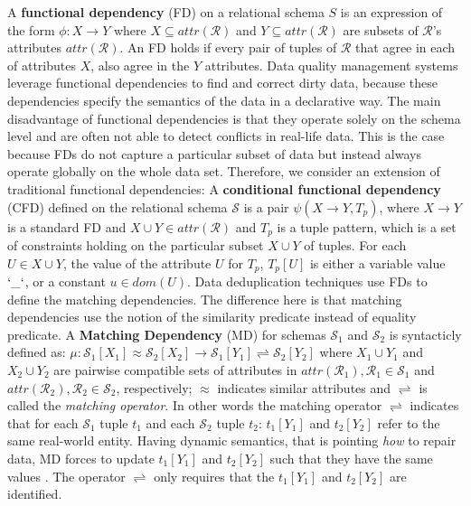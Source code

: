A \textbf{functional dependency} (FD) on a relational schema $S$ is an expression of the form $\phi: X \rightarrow Y$ where $X \subseteq attr(\mathcal{R}) $ and $Y \subseteq attr(\mathcal{R}) $ are subsets of $\mathcal{R}$'s attributes $attr(\mathcal{R})$. An FD holds if every pair of tuples of $\mathcal{R}$ that agree in each of attributes $X$, also agree in the $Y$ attributes.
Data quality management systems leverage functional dependencies to find and correct dirty data, because these dependencies specify the semantics of the data in a declarative way. The main disadvantage of functional dependencies is that they operate solely on the schema level and are often not able to detect conflicts in real-life data. This is the case because FDs do not capture a particular subset of data but instead always operate globally on the whole data set.
Therefore, we consider an extension of traditional functional dependencies:  A \textbf{conditional functional dependency} (CFD) defined on the relational schema $\mathcal{S}$ is a pair $\psi(X \rightarrow Y , T_p)$,  where $X \rightarrow Y$ is a standard FD and $X \cup Y \in attr(\mathcal{R})$ and $T_p$ is a tuple pattern, which is a set of constraints holding on the particular subset $X \cup Y$ of tuples. 
For each $U \in X \cup Y$, the value of the attribute $U$ for $T_p$, $T_p[U]$ is either a variable value $`\_`$, or a constant $u \in dom(U)$. Data deduplication techniques use FDs to define the matching dependencies. The difference here is that matching dependencies use the notion of the similarity predicate instead of equality predicate. A \textbf{Matching Dependency} (MD) for schemas $\mathcal{S}_1$ and $\mathcal{S}_2$ is syntacticly defined as:
  $\mu: \mathcal{S}_1[X_1]\approx \mathcal{S}_2[X_2]\rightarrow \mathcal{S}_1[Y_1]\rightleftharpoons \mathcal{S}_2[Y_2]$ 
  where $X_1 \cup Y_1$ and $X_2 \cup Y_2$ are pairwise compatible sets of attributes in $attr(\mathcal{R}_1), \mathcal{R}_1\in \mathcal{S}_1$ and $attr(\mathcal{R}_2), \mathcal{R}_2\in \mathcal{S}_2$, respectively; $\approx$ indicates
  similar attributes and $\rightleftharpoons$ is called the \textit{matching operator}. In other words the matching operator $\rightleftharpoons$ indicates that for each $\mathcal{S}_1$ tuple $t_1$ and each $\mathcal{S}_2$ tuple $t_2$: $t_1[Y_1]$ and $t_2[Y_2]$ refer to the same real-world entity. Having dynamic semantics, that is pointing \textit{how} to repair data, MD forces to update $t_1[Y_1]$ and $t_2[Y_2]$ such that they have the same values . The operator $\rightleftharpoons$ only requires that the $t_1[Y_1]$ and $t_2[Y_2]$ are identified.

